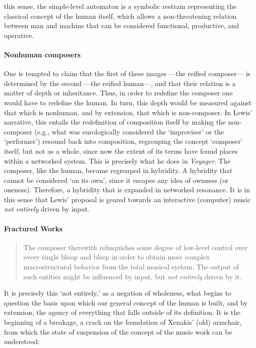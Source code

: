 this sense, the simple-level automaton is a symbolic restrain representing the classical concept of the human itself, which allows a non-threatening relation between man and machine that can be considered functional, productive, and operative.

\paragraph{Nonhuman composers}
One is tempted to claim that the first of these images ---the reified composer--- is determined by the second ---the reified human---, and that their relation is a matter of depth or inheritance. Thus, in order to redefine the composer one would have to redefine the human. In turn, this depth would be measured against that which is nonhuman, and by extension, that which is non-composer. In Lewis' narrative, this entails the redefinition of composition itself by making the non-composer (e.g., what was eurologically considered the `improviser' or the `performer') resound back into composition, regrouping the concept `composer' itself, but not as a whole, since now the extent of its terms have found places within a networked system. This is precisely what he does in \textit{Voyager}. The composer, like the human, became regrouped in hybridity. A hybridity that cannot be considered `on its own', since it escapes any idea of ownness (or oneness). Therefore, a hybridity that is expanded in networked resonance. It is in this sense that Lewis' proposal is geared towards an interactive (computer) music \textit{not entirely} driven by input.

\paragraph{Fractured Works}

\begin{quote}
	The composer therewith relinquishes some degree of low-level control over every single bloop and bleep in order to obtain more complex macrostructural behavior from the total musical system. The output of such entities might be influenced by input, but \textit{not entirely} driven by it. \im \parencite[11]{Lew93:Put}
\end{quote}

It is precisely this `not entirely,' as a negation of wholeness, what begins to question the basis upon which our general concept of the human is built, and by extension, the agency of everything that falls outside of its definition. It is the beginning of a breakage, a crack on the foundation of Xenakis' (old) armchair, from which the state of suspension of the concept of the music work can be understood:

